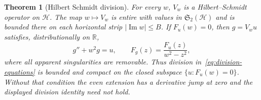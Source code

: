 \documentclass[11pt,a4paper]{article}
\numberwithin{equation}{section}
\newtheorem{theorem}{Theorem}[section]
\theoremstyle{definition}
\theoremstyle{remark}
\newcommand{\R}{\mathbb R}
\newcommand{\Hh}{\mathcal H}
\newcommand{\HS}{\mathfrak S_2}
\begin{document}
\begin{theorem}[Hilbert Schmidt division]\label{thm:division}
For every $w$, $V_w$ is a Hilbert--Schmidt operator on $\Hh$. The map $w\mapsto V_w$ is entire with values in $\HS(\Hh)$ and is bounded there on each horizontal strip $|\operatorname{Im}w|\le B$. If $F_u(w)=0$, then $g=V_wu$ satisfies, distributionally on $\R$,
\begin{equation}\label{eq:division-equations}
 g''+w^2g=u,\qquad
 F_g(z)=\frac{F_u(z)}{w^2-z^2},
\end{equation}
where all apparent singularities are removable. Thus division in~\eqref{eq:division-equations} is bounded and compact on the closed subspace $\{u:F_u(w)=0\}$. Without that condition the even extension has a derivative jump at zero and the displayed division identity need not hold.
\end{theorem}
\end{document}
